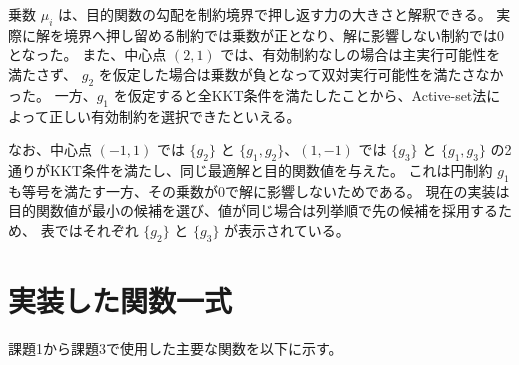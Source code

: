 \documentclass[11pt,a4paper]{ltjsarticle}
\begin{document}
乗数 $\mu_i$ は、目的関数の勾配を制約境界で押し返す力の大きさと解釈できる。
実際に解を境界へ押し留める制約では乗数が正となり、解に影響しない制約では0となった。
また、中心点 $(2,1)$ では、有効制約なしの場合は主実行可能性を満たさず、
$g_2$ を仮定した場合は乗数が負となって双対実行可能性を満たさなかった。
一方、$g_1$ を仮定すると全KKT条件を満たしたことから、Active-set法によって正しい有効制約を選択できたといえる。

なお、中心点 $(-1,1)$ では $\{g_2\}$ と $\{g_1,g_2\}$、$(1,-1)$ では
$\{g_3\}$ と $\{g_1,g_3\}$ の2通りがKKT条件を満たし、同じ最適解と目的関数値を与えた。
これは円制約 $g_1$ も等号を満たす一方、その乗数が0で解に影響しないためである。
現在の実装は目的関数値が最小の候補を選び、値が同じ場合は列挙順で先の候補を採用するため、
表ではそれぞれ $\{g_2\}$ と $\{g_3\}$ が表示されている。
\appendix
\section{実装した関数一式}
課題1から課題3で使用した主要な関数を以下に示す。

\end{document}
